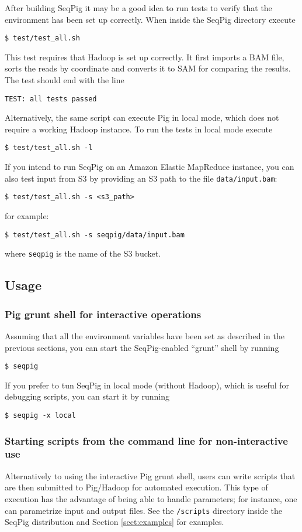After building SeqPig it may be a good idea to run tests to verify that
the environment has been set up correctly. When inside the SeqPig directory
execute
\begin{lstlisting} 
$ test/test_all.sh
\end{lstlisting}
This test requires that Hadoop is set up correctly. It first imports a BAM
file, sorts the reads by coordinate and converts it to SAM for comparing
the results. The test should end with the line
\begin{lstlisting}
TEST: all tests passed
\end{lstlisting}
Alternatively, the same script can execute Pig in local mode, which does not
require a working Hadoop instance. To run the tests in local mode execute
\begin{lstlisting} 
$ test/test_all.sh -l
\end{lstlisting}
If you intend to run SeqPig on an Amazon Elastic MapReduce instance, you can
also test input from S3 by providing an S3 path to the file {\tt data/input.bam}:
\begin{lstlisting} 
$ test/test_all.sh -s <s3_path>
\end{lstlisting}
for example:
\begin{lstlisting} 
$ test/test_all.sh -s seqpig/data/input.bam
\end{lstlisting}
where {\tt seqpig} is the name of the S3 bucket.

\subsection{Usage}

\subsubsection{Pig grunt shell for interactive operations}
Assuming that all the environment variables have been set as described in the
previous sections, you can start the SeqPig-enabled ``grunt'' shell by running
%
\begin{lstlisting}
$ seqpig
\end{lstlisting}
%
If you prefer to tun SeqPig in local mode (without Hadoop), which is useful
for debugging scripts, you can start it by running
%
\begin{lstlisting}
$ seqpig -x local
\end{lstlisting}
%
\subsubsection{Starting scripts from the command line for non-interactive use}
Alternatively to using the interactive Pig grunt shell, users can write scripts
that are then submitted to Pig/Hadoop for automated execution. This type of
execution has the advantage of being able to handle parameters; for instance,
one can parametrize input and output files. See the {\tt /scripts} directory
inside the SeqPig distribution and Section \ref{sect:examples} for examples.
